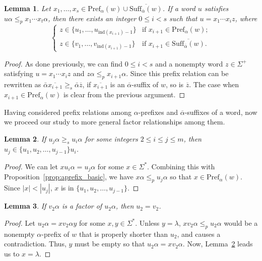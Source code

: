 \documentclass{article}
\theoremstyle{plain}
\newtheorem{lemma}{Lemma}
\theoremstyle{remark}
\newcommand{\Pref}{\ensuremath{\mathrm{Pref}}}
\newcommand{\Suff}{\ensuremath{\mathrm{Suff}}}
\newcommand{\ind}{\ensuremath{\mathrm{ind}}}
\newcommand{\calpha}{\ensuremath{\overline{\alpha}}}
\begin{document}
\begin{lemma}\label{lem:apref_casuf_apref}
	Let $x_1, \ldots, x_s \in \Pref_\alpha(w) \cup \overline{\Suff_{\calpha}(w)}$. 
	If a word $u$ satisfies $u\alpha \le_p x_1 \cdots x_t \alpha$, then there exists an integer $0 \le i < s$ such that $u = x_1 \cdots x_i z$, where 
	\[
	\begin{cases}
	z \in \{u_1, \ldots, u_{\ind(x_{i+1})-1}\} & \text{if $x_{i+1} \in \Pref_\alpha(w)$}; \\
	z \in \{v_1, \ldots, v_{\ind(x_{i+1})-1}\} & \text{if $x_{i+1} \in \overline{\Suff_{\calpha}(w)}$}. 
	\end{cases}
	\] 
\end{lemma}
\begin{proof}
	As done previously, we can find $0 \le i < s$ and a nonempty word $z \in \Sigma^+$ satisfying $u = x_1 \cdots x_i z$ and $z \alpha \le_p x_{i+1} \alpha$. 
	Since this prefix relation can be rewritten as $\bar{\alpha} \overline{x_{i+1}} \ge_s \bar{\alpha} \overline{z}$, if $\overline{x_{i+1}}$ is an $\overline{\alpha}$-suffix of $w$, so is $\overline{z}$. 
	The case when $x_{i+1} \in \Pref_\alpha(w)$ is clear from the previous argument. 
\end{proof}

Having considered prefix relations among $\alpha$-prefixes and $\calpha$-suffixes of a word, now we proceed our study to more general factor relationships among them. 

\begin{lemma}\label{lem:suf_relation_aprefs}
	If $u_j \alpha \ge_s u_i \alpha$ for some integers $2 \le i \le j \le m$, then $u_j \in \{u_1, u_2, \ldots, u_{j-1}\}u_i$. 
\end{lemma}
\begin{proof}
	We can let $x u_i \alpha = u_j \alpha$ for some $x \in \Sigma^*$. 
	Combining this with Proposition~\ref{prop:aprefix_basic}, we have $x \alpha \le_p u_j \alpha$ so that $x \in \Pref_\alpha(w)$. 
	Since $|x| < |u_j|$, $x$ is in $\{u_1, u_2, \ldots, u_{j-1}\}$. 
\end{proof}

\begin{lemma}\label{lem:factor_relation_shortests}
	If $v_2 \alpha$ is a factor of $u_2 \alpha$, then $u_2 = v_2$. 
\end{lemma}
\begin{proof}
	Let $u_2 \alpha = xv_2 \alpha y$ for some $x, y \in \Sigma^*$. 
	Unless $y = \lambda$, $xv_2 \alpha \le_p u_2 \alpha$ would be a nonempty $\alpha$-prefix of $w$ that is properly shorter than $u_2$, and causes a contradiction. 
	Thus, $y$ must be empty so that $u_2 \alpha = x v_2 \alpha$. 
	Now, Lemma~\ref{lem:suf_relation_aprefs} leads us to $x = \lambda$. 
\end{proof}
\end{document}
